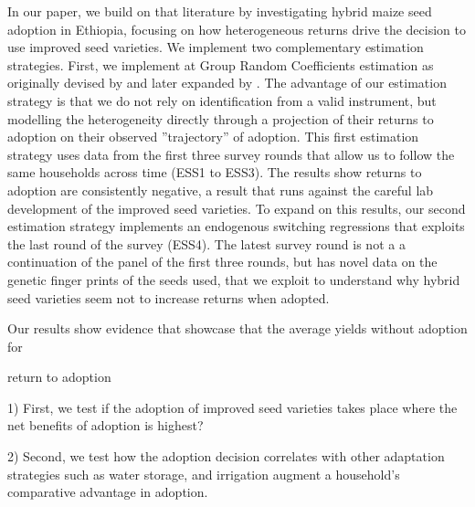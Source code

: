 \documentclass{article}
\begin{document}
In our paper, we build on that literature by investigating hybrid maize seed adoption in Ethiopia, focusing on how heterogeneous returns drive the decision to use improved seed varieties. We implement two complementary estimation strategies. First, we implement at Group Random Coefficients estimation as originally devised by \cite{Suri2011-oi} and later expanded by \citep{Tjernstrom_Emilia_Dalia_Ghanem_Oscar_Barriga_Cabanillas_Travis_J_Lybbert_Jeffrey_D_Michler_and_Aleksandr_Michuda2020-bc}. The advantage of our estimation strategy is that we do not rely on identification from a valid instrument,
but modelling the heterogeneity directly through a projection of their returns to adoption on their observed
”trajectory” of adoption. This first estimation strategy uses data from the first three survey rounds that allow us to follow the same households across time (ESS1 to ESS3). The results show returns to adoption are consistently negative, a result that runs against the careful lab development of the improved seed varieties. To expand on this results, our second estimation strategy implements an endogenous switching regressions that exploits the last round of the survey (ESS4). The latest survey round is not a a continuation of the panel of the first three rounds, but has novel data on the genetic finger prints of the seeds used, that we exploit to understand why hybrid seed varieties seem not to increase returns when adopted. 



Our results show evidence that showcase that the average yields without adoption for 

return to adoption



1) First, we test if the adoption of improved seed varieties takes place where the net benefits of adoption is highest? 

2) Second, we test how the adoption decision correlates with other adaptation strategies such as water storage, and irrigation augment a household’s comparative advantage in adoption.
\end{document}
